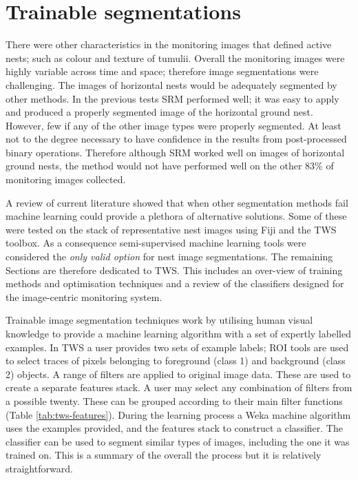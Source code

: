 \section{Trainable segmentations} 
There were other characteristics in the monitoring images that defined active nests; such as colour and texture of tumulii. Overall the monitoring images were highly variable across time and space; therefore image segmentations were challenging. The images of horizontal nests would be adequately segmented by other methods. In the previous tests \ac{SRM} performed well; it was easy to apply and produced a properly segmented image of the horizontal ground nest. However, few if any of the other image types were properly segmented. At least not to the degree necessary to have confidence in the results from post-processed binary operations. Therefore although \ac{SRM} worked well on images of horizontal ground nests, the method would not have performed well on the other 83\% of monitoring images collected. 

A review of current literature showed that when other segmentation methods fail machine learning could provide a plethora of alternative solutions. Some of these were tested on the stack of representative nest images using Fiji and the \ac{TWS} toolbox. As a consequence {semi-supervised} machine learning tools were considered the \emph{only valid option} for nest image segmentations. The remaining Sections are therefore dedicated to \acf{TWS}. This includes an over-view of training methods and optimisation techniques and a review of the classifiers designed for the image-centric monitoring system. 

Trainable image segmentation techniques work by utilising human visual knowledge to provide a machine learning algorithm with a set of {expertly labelled examples}. In \ac{TWS} a user provides two sets of example labels; \ac{ROI} tools are used to select traces of pixels belonging to foreground (class 1) and background (class 2) objects. A range of filters are applied to original image data. These are used to create a separate features stack. A user may select any combination of filters from a possible twenty. These can be grouped according to their main filter functions (Table \ref{tab:tws-features}). During the learning process a Weka machine  algorithm uses the examples provided, and the features stack to construct a classifier. The classifier can be used to segment similar types of images, including the one it was trained on. This is a summary of the overall the process but it is relatively straightforward.

